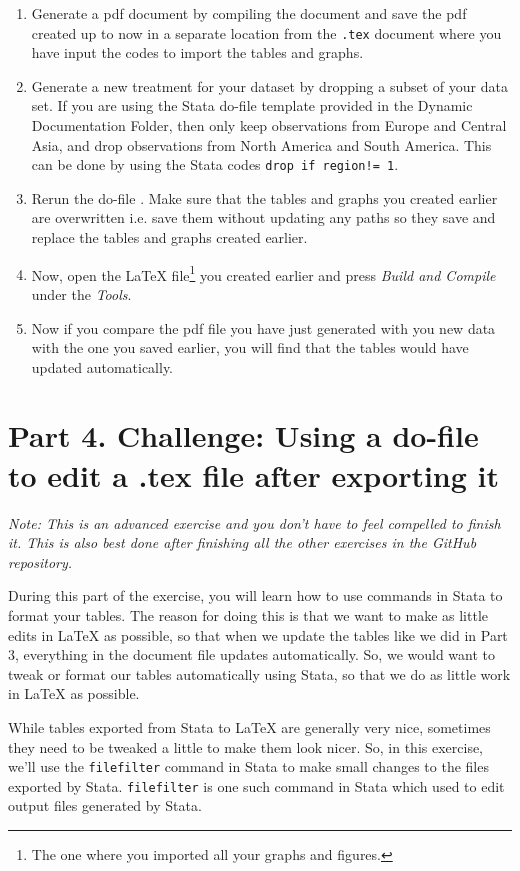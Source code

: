 \documentclass[12pts]{report}
\begin{document}
\begin{enumerate}
	\item Generate a pdf document by compiling the document and save the pdf created up to now in a separate location from the \texttt{.tex} document where you have input the codes to import the tables and graphs. 
	\item Generate a new treatment for your dataset by dropping a subset of your data set. 
	\subitem If you are using the Stata do-file template provided in the Dynamic Documentation Folder, then only keep observations from Europe and Central Asia, and drop observations from North America and South America. This can be done by using the Stata codes \texttt{drop if region!= 1}. 
	\item Rerun the do-file . Make sure that the tables and graphs you created earlier are overwritten i.e. save them without updating any paths so they save and replace the tables and graphs created earlier. 
	\item Now, open the {\LaTeX} file\footnote{The one where you imported all your graphs and figures.} you created earlier and press \textit{Build and Compile} under the \textit{Tools}.
	\item Now if you compare the pdf file you have just generated with you new data with the one you saved earlier, you will find that the tables would have updated automatically. 
\end{enumerate}

\section*{Part 4. Challenge: Using a do-file to edit a .tex file after exporting it}
\textit{Note: This is an advanced exercise and you don't have to feel compelled to finish it. This is also best done after finishing all the other exercises in the GitHub repository.}
 
During this part of the exercise, you will learn how to use commands in Stata to format your tables. The reason for doing this is that we want to make as little edits in {\LaTeX} as possible, so that when we update the tables like we did in Part 3, everything in the document file updates automatically. So, we would want to tweak or format our tables automatically using Stata, so that we do as little work in {\LaTeX} as possible.

While tables exported from Stata to {\LaTeX} are generally very nice, sometimes they need to be tweaked a little to make them look nicer. So, in this exercise, we'll use the \texttt{filefilter} command in Stata to make small changes to the files exported by Stata. \texttt{filefilter} is one such command in Stata which used to edit output files generated by Stata.  
\end{document}
